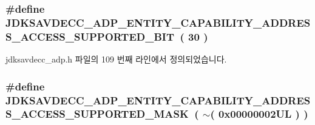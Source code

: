 \subsubsection[{\texorpdfstring{J\+D\+K\+S\+A\+V\+D\+E\+C\+C\+\_\+\+A\+D\+P\+\_\+\+E\+N\+T\+I\+T\+Y\+\_\+\+C\+A\+P\+A\+B\+I\+L\+I\+T\+Y\+\_\+\+A\+D\+D\+R\+E\+S\+S\+\_\+\+A\+C\+C\+E\+S\+S\+\_\+\+S\+U\+P\+P\+O\+R\+T\+E\+D\+\_\+\+B\+IT}{JDKSAVDECC_ADP_ENTITY_CAPABILITY_ADDRESS_ACCESS_SUPPORTED_BIT}}]{\setlength{\rightskip}{0pt plus 5cm}\#define J\+D\+K\+S\+A\+V\+D\+E\+C\+C\+\_\+\+A\+D\+P\+\_\+\+E\+N\+T\+I\+T\+Y\+\_\+\+C\+A\+P\+A\+B\+I\+L\+I\+T\+Y\+\_\+\+A\+D\+D\+R\+E\+S\+S\+\_\+\+A\+C\+C\+E\+S\+S\+\_\+\+S\+U\+P\+P\+O\+R\+T\+E\+D\+\_\+\+B\+IT~( 30 )}\hypertarget{group__adp__entity__capability_ga9eaa1d879826bb750e553a490e1ecc8f}{}\label{group__adp__entity__capability_ga9eaa1d879826bb750e553a490e1ecc8f}


jdksavdecc\+\_\+adp.\+h 파일의 109 번째 라인에서 정의되었습니다.

\subsubsection[{\texorpdfstring{J\+D\+K\+S\+A\+V\+D\+E\+C\+C\+\_\+\+A\+D\+P\+\_\+\+E\+N\+T\+I\+T\+Y\+\_\+\+C\+A\+P\+A\+B\+I\+L\+I\+T\+Y\+\_\+\+A\+D\+D\+R\+E\+S\+S\+\_\+\+A\+C\+C\+E\+S\+S\+\_\+\+S\+U\+P\+P\+O\+R\+T\+E\+D\+\_\+\+M\+A\+SK}{JDKSAVDECC_ADP_ENTITY_CAPABILITY_ADDRESS_ACCESS_SUPPORTED_MASK}}]{\setlength{\rightskip}{0pt plus 5cm}\#define J\+D\+K\+S\+A\+V\+D\+E\+C\+C\+\_\+\+A\+D\+P\+\_\+\+E\+N\+T\+I\+T\+Y\+\_\+\+C\+A\+P\+A\+B\+I\+L\+I\+T\+Y\+\_\+\+A\+D\+D\+R\+E\+S\+S\+\_\+\+A\+C\+C\+E\+S\+S\+\_\+\+S\+U\+P\+P\+O\+R\+T\+E\+D\+\_\+\+M\+A\+SK~( $\sim$( 0x00000002\+U\+L ) )}\hypertarget{group__adp__entity__capability_gad858f615cc2f28e914274e605bb77881}{}\label{group__adp__entity__capability_gad858f615cc2f28e914274e605bb77881}


